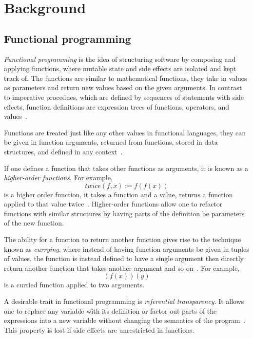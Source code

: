 \chapter{Background}\label{ch:background}

\section{Functional programming}\label{sec:functional}

\emph{Functional programming} is the idea of structuring software by composing
and applying functions, where mutable state and side effects are isolated and
kept track of. The functions are similar to mathematical functions, they take in
values as parameters and return new values based on the given arguments. In
contrast to imperative procedues, which are defined by sequences of statements
with side effects, function definitions are expression trees of functions,
operators, and values~\cite{functional-Hudak, functional-Hughes}.

Functions are treated just like any other values in functional languages, they
can be given in function arguments, returned from functions, stored in data
structures, and defined in any context~\cite{functional-Hudak, sicp}.

If one defines a function that takes other functions as arguments, it is known
as a \emph{higher-order functions}. For example,
\begin{equation}
  \mathit{twice}(f, x) := f(f(x))
  \label{eq:higher-order-ex}
\end{equation}
is a higher order function, it takes a function and a value, returns a function
applied to that value twice~\cite{functional-Hudak}. Higher-order functions
allow one to refactor functions with similar structures by having parts of the
definition be parameters of the new function.

The ability for a function to return another function gives rise to the
technique known as \emph{currying}, where instead of having function arguments
be given in tuples of values, the function is instead defined to have a single
argument then directly return another function that takes another argument and
so on~\cite{functional-Hudak, functional-Barendregt, combinator-Curry}. For
example,
\begin{equation}
  (f(x))(y)
  \label{eq:curry-ex}
\end{equation}
is a curried function applied to two arguments.

A desirable trait in functional programming is \emph{referential transparency}.
It allows one to replace any variable with its definition or factor out parts of
the expressions into a new variable without changing the semantics of the
program~\cite{functional-Hudak, functional-Hughes, functional-Barendregt}. This
property is lost if side effects are unrestricted in functions.

